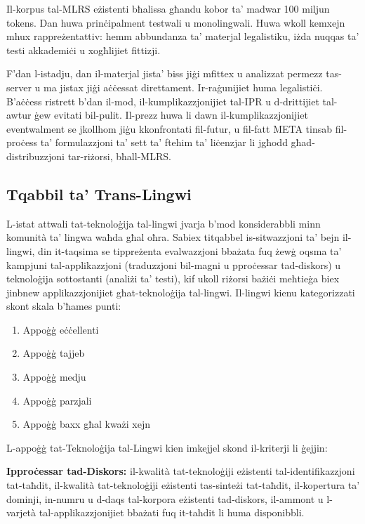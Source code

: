 \documentclass[]{../../metanetpaper}
\begin{document}
\begin{multicols}{2}
Il-korpus tal-MLRS eżistenti bħalissa għandu kobor ta’ madwar 100 miljun tokens. Dan huwa prinċipalment testwali u monolingwali. Huwa wkoll kemxejn mhux rappreżentattiv: hemm abbundanza ta’ materjal legalistiku, iżda nuqqas ta’ testi akkademiċi u xogħlijiet fittizji.

F'dan l-istadju, dan il-materjal jista’ biss jiġi mfittex u analizzat permezz tas-server u ma jistax jiġi aċċessat direttament. Ir-raġunijiet huma legalistiċi. B’aċċess ristrett b’dan il-mod, il-kumplikazzjonijiet tal-IPR u d-drittijiet tal-awtur ġew evitati bil-pulit. Il-prezz huwa li dawn il-kumplikazzjonijiet eventwalment se jkollhom jiġu kkonfrontati fil-futur, u fil-fatt META tinsab fil-proċess ta’ formulazzjoni ta’ sett ta’ ftehim ta’ liċenzjar li jgħodd għad-distribuzzjoni tar-riżorsi, bħall-MLRS.


\subsection{Tqabbil ta’ Trans-Lingwi }

L-istat attwali tat-teknoloġija tal-lingwi jvarja b’mod konsiderabbli minn komunità ta’ lingwa waħda għal oħra. Sabiex titqabbel is-sitwazzjoni ta’ bejn il-lingwi, din it-taqsima se tippreżenta evalwazzjoni bbażata fuq żewġ oqsma ta’ kampjuni tal-applikazzjoni (traduzzjoni bil-magni u pproċessar tad-diskors) u teknoloġija sottostanti (analiżi ta’ testi), kif ukoll riżorsi bażiċi meħtieġa biex jinbnew applikazzjonijiet għat-teknoloġija tal-lingwi. 
Il-lingwi kienu kategorizzati skont skala b'ħames punti:

\begin{enumerate}
\item Appoġġ eċċellenti
\item Appoġġ tajjeb
\item Appoġġ medju
\item Appoġġ parzjali
\item Appoġġ baxx għal kważi xejn
\end{enumerate}

L-appoġġ tat-Teknoloġija tal-Lingwi kien imkejjel skond il-kriterji li ġejjin:

\textbf{Ipproċessar tad-Diskors:} il-kwalità tat-teknoloġiji eżistenti tal-identifikazzjoni tat-taħdit, il-kwalità tat-teknoloġiji eżistenti tas-sinteżi tat-taħdit, il-kopertura ta' dominji, in-numru u d-daqs tal-korpora eżistenti tad-diskors, il-ammont u l-varjetà tal-applikazzjonijiet bbażati fuq it-taħdit li huma disponibbli.


\end{multicols}
\end{document}
